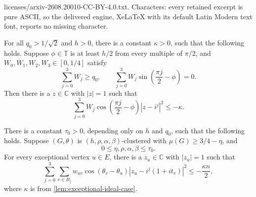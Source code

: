 \documentclass[10pt,a4paper]{amsart}
\newcommand{\CC}{\mathbb{C}}
\newcommand{\T}{\mathbb{T}}
\newcommand{\abs}[1]{\left\lvert #1\right\rvert}
\newcommand{\paren}[1]{\left(#1\right)}
\begin{document}
licenses/arxiv-2608.20010-CC-BY-4.0.txt. Characters: every retained excerpt is pure ASCII, so the delivered engine, XeLaTeX with its default Latin Modern text font, reports no missing character.
\begin{lemma}\label{lem:exceptional-ideal-case}
For all $q_0 > 1/\sqrt2$ and $h > 0$, there is a constant $\kappa>0$, such that the following  holds.  Suppose $\phi\in\T$ is at least $h/2$ from every multiple of $\pi/2$, and $W_0,W_1,W_2,W_3\in[0,1/4]$ satisfy
\[
    \sum_{j=0}^3W_j\ge q_0,
    \qquad
    \sum_{j=0}^3W_j\sin\paren{\frac{\pi j}{2}-\phi}=0.
\]
Then there is a $z\in\CC$ with $\abs z=1$ such that
\[
    \sum_{j=0}^3W_j\cos\paren{\frac{\pi j}{2}-\phi}
       \abs{z-i^j}^2\le-\kappa.
\]
\end{lemma}

\begin{lemma}\label{lem:exceptional-vertex-main}
There is a constant $\tau_0>0$, depending only on $h$ and $q_0$, such that the
following holds.  Suppose $(G,\theta)$ is
$(h,\rho,\alpha,\beta)$-clustered with $\mu(G)\ge3/4-\eta$, and
\[
    0\le\eta,\rho,\alpha,\beta\le\tau_0.
\]
For every exceptional vertex $u\in E$, there is a $z_u\in\CC$ with
$\abs{z_u}=1$ such that
\begin{equation}\label{eq:exceptional-vertex-negative}
\sum_{j=0}^3\sum_{v\in B_j}
w_{uv}\cos(\theta_v-\theta_u)
\abs{z_u-i^j(1+it_v)}^2
\le-\frac{\kappa n}{2},
\end{equation}
where $\kappa$ is from \cref{lem:exceptional-ideal-case}.
\end{lemma}
\end{document}
